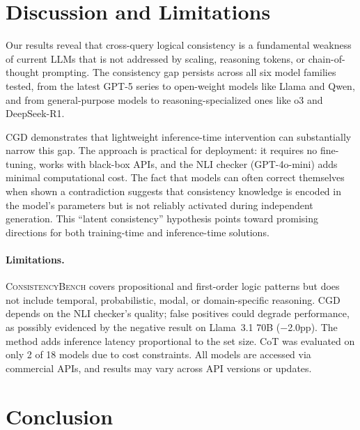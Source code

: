 \documentclass{article}
\newcommand{\bench}{\textsc{ConsistencyBench}}
\newcommand{\method}{\textsc{CGD}}
\begin{document}
\section{Discussion and Limitations}
\label{sec:discussion}

Our results reveal that cross-query logical consistency is a fundamental weakness of current LLMs that is not addressed by scaling, reasoning tokens, or chain-of-thought prompting. The consistency gap persists across all six model families tested, from the latest GPT-5 series to open-weight models like Llama and Qwen, and from general-purpose models to reasoning-specialized ones like o3 and DeepSeek-R1.

\method{} demonstrates that lightweight inference-time intervention can substantially narrow this gap. The approach is practical for deployment: it requires no fine-tuning, works with black-box APIs, and the NLI checker (GPT-4o-mini) adds minimal computational cost. The fact that models can often correct themselves when shown a contradiction suggests that consistency knowledge is encoded in the model's parameters but is not reliably activated during independent generation. This ``latent consistency'' hypothesis points toward promising directions for both training-time and inference-time solutions.

\paragraph{Limitations.} \bench{} covers propositional and first-order logic patterns but does not include temporal, probabilistic, modal, or domain-specific reasoning. \method{} depends on the NLI checker's quality; false positives could degrade performance, as possibly evidenced by the negative result on Llama~3.1 70B ($-$2.0pp). The method adds inference latency proportional to the set size. CoT was evaluated on only 2 of 18 models due to cost constraints. All models are accessed via commercial APIs, and results may vary across API versions or updates.

\section{Conclusion}
\label{sec:conclusion}
\end{document}
